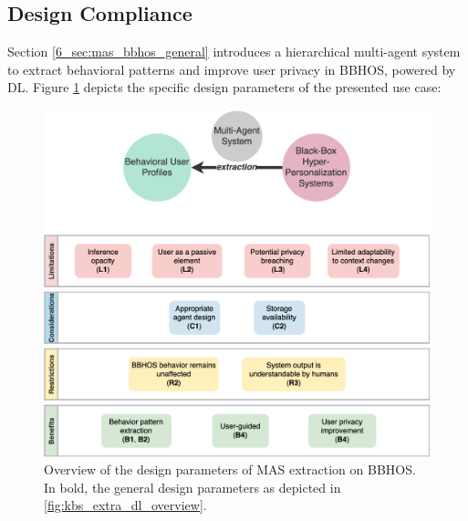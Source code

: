 \subsection{Design Compliance}\label{6_sec:subsec:mas_design_compliance}
Section \ref{6_sec:mas_bbhos_general} introduces a hierarchical multi-agent system to extract behavioral patterns and improve user privacy in BBHOS, powered by DL. Figure \ref{fig:compliance_mas_extra_dl} depicts the specific design parameters of the presented use case:
\begin{figure}[t]
    \centering
    \includegraphics[width=\linewidth]{6_kbsextractiondl/figures/Instance_MAS_K_extraction_DL.eps}
    \caption{Overview of the design parameters of MAS extraction on BBHOS. In bold, the general design parameters as depicted in \ref{fig:kbs_extra_dl_overview}.}
    \label{fig:compliance_mas_extra_dl}
\end{figure}

